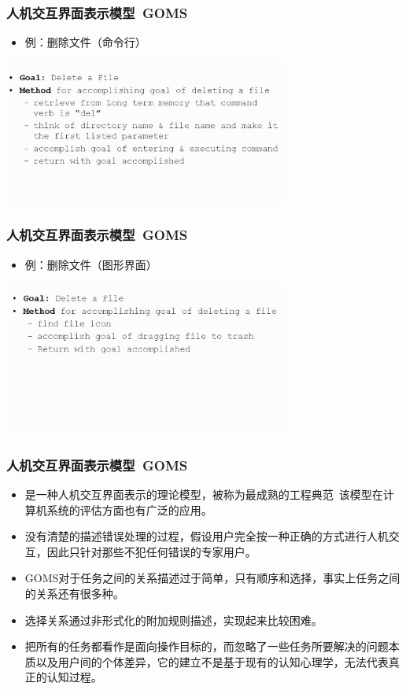 \documentclass{beamer}
\begin{document}
\begin{frame}
	\frametitle{人机交互界面表示模型~{\small GOMS}}
	\beamertemplatetransparentcovereddynamicmedium
	\begin{itemize}
		\item 例：删除文件（命令行）
	\end{itemize}
	\begin{center}
	\includegraphics[width=0.7\textwidth]{images/goms-sample-5.jpg}
	\end{center}
\end{frame}

\begin{frame}
	\frametitle{人机交互界面表示模型~{\small GOMS}}
	\beamertemplatetransparentcovereddynamicmedium
	\begin{itemize}
		\item 例：删除文件（图形界面）
	\end{itemize}
	\begin{center}
	\includegraphics[width=0.7\textwidth]{images/goms-sample-6.jpg}
	\end{center}
\end{frame}

\begin{frame}
	\frametitle{人机交互界面表示模型~{\small GOMS}}
	\beamertemplatetransparentcovereddynamicmedium
	\begin{itemize}[<+->]
		\item 是一种人机交互界面表示的理论模型，被称为最成熟的工程典范~{\tiny 该模型在计算机系统的评估方面也有广泛的应用。}
		\item 没有清楚的描述错误处理的过程，{\tiny 假设用户完全按一种正确的方式进行人机交互，因此只针对那些不犯任何错误的专家用户。}
		\item GOMS对于任务之间的关系描述过于简单，{\tiny 只有顺序和选择，事实上任务之间的关系还有很多种。}
		\item 选择关系通过非形式化的附加规则描述，实现起来比较困难。
		\item 把所有的任务都看作是面向操作目标的，而忽略了一些任务所要解决的问题本质以及用户间的个体差异，{\tiny 它的建立不是基于现有的认知心理学，无法代表真正的认知过程。}
	\end{itemize}
\end{frame}
\end{document}

